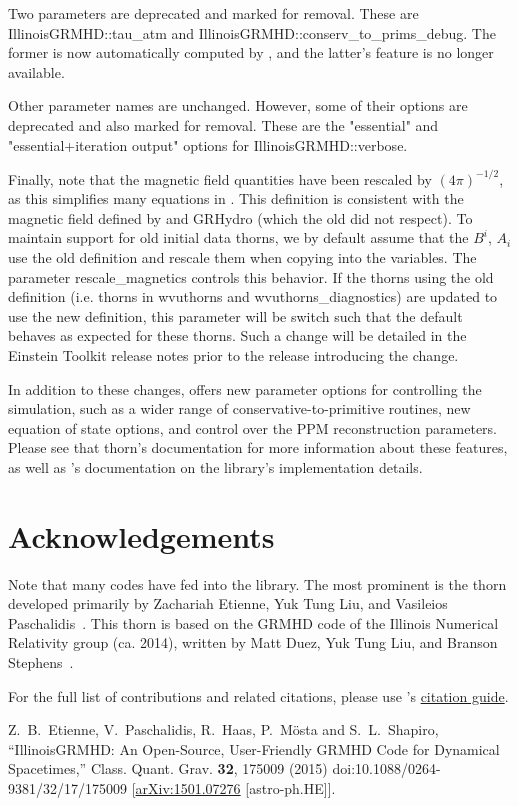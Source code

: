 \documentclass{article}
\begin{document}
Two parameters are deprecated and marked for removal. These are
IllinoisGRMHD::tau\_atm and IllinoisGRMHD::conserv\_to\_prims\_debug. The former
is now automatically computed by \glib, and the latter's feature is no
longer available.

Other \igm{} parameter names are unchanged. However, some of their options
are deprecated and also marked for removal. These are the "essential" and
"essential+iteration output" options for IllinoisGRMHD::verbose.

Finally, note that the magnetic field quantities have been rescaled by
$\left(4\pi\right)^{-1/2}$, as this simplifies many equations in \grhayl.
This definition is consistent with the magnetic field defined by \hydrobase{}
and GRHydro (which the old \igm{} did not respect). To maintain support for
old initial data thorns, we by default assume that the \hydrobase{} $B^i$,
$A_i$ use the old definition and rescale them when copying into the \igm{}
variables. The parameter rescale\_magnetics controls this behavior. If
the thorns using the old definition (i.e. thorns in wvuthorns and
wvuthorns\_diagnostics) are updated to use the new definition, this parameter
will be switch such that the default behaves as expected for these thorns.
Such a change will be detailed in the Einstein Toolkit release notes prior
to the release introducing the change.

In addition to these changes, \glib{} offers new parameter options for
controlling the simulation, such as a wider range of conservative-to-primitive
routines, new equation of state options, and control over the PPM reconstruction
parameters. Please see that thorn's documentation for more information about these
features, as well as \grhayl's documentation on the library's implementation
details.

\section{Acknowledgements}

Note that many codes have fed into the \grhayl{} library. The most prominent is
the \igm{} thorn developed primarily by Zachariah Etienne, Yuk Tung Liu, and
Vasileios Paschalidis~\cite{WVUThorns_IllinoisGRMHD_Etienne:2015cea}. This
thorn is based on the GRMHD code of the Illinois Numerical Relativity group
(ca. 2014), written by Matt Duez, Yuk Tung Liu, and Branson Stephens~.

For the full list of contributions and related citations, please use \grhayl's
\href{https://github.com/GRHayL/GRHayL/wiki/Citation-and-License-Guide}{citation guide}.

\begin{thebibliography}{9}

Z.~B.~Etienne, V.~Paschalidis, R.~Haas, P.~M\"osta and S.~L.~Shapiro,
``IllinoisGRMHD: An Open-Source, User-Friendly GRMHD Code for Dynamical
Spacetimes,''
Class. Quant. Grav. \textbf{32}, 175009 (2015)
doi:10.1088/0264-9381/32/17/175009
[\href{https://arxiv.org/abs/1501.07276}{arXiv:1501.07276} [astro-ph.HE]].

\end{thebibliography}

\end{document}
